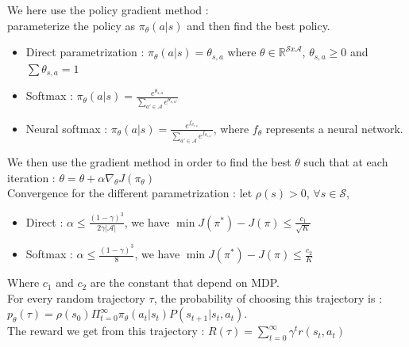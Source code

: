 \documentclass[../main.tex]{subfiles}
\begin{document}
We here use the policy gradient method : \\
parameterize the policy as $\pi_\theta(a\lvert s)$ and then find the best policy.\\

\begin{itemize}
    \item Direct parametrization : $\pi_\theta(a\lvert s) = \theta_{s,a}$ where $\theta \in \mathbb{R}^{\mathcal{S}x \mathcal{A}}$, $\theta_{s,a} \geq 0$ and $\sum \theta_{s,a} = 1$\\
    \item Softmax : $\pi_\theta (a\lvert s) = \frac{e^{\theta_{s,a}}}{\sum_{a'\in \mathcal{A}} e^{\theta_{s,a'}}}$\\
    \item Neural softmax : $\pi_\theta(a\lvert s) = \frac{e^{f_{\theta_{s,a}}}}{\sum_{a'\in \mathcal{A}} e^{f_{\theta_{s,a'}}}}$, where $f_\theta$ represents a neural network.\\
\end{itemize}

We then use the gradient method in order to find the best $\theta$ such that at each iteration : $\theta = \theta + \alpha \nabla_\theta J(\pi_\theta)$\\

Convergence for the different parametrization : let $\rho(s) >0$, $\forall s \in \mathcal{S}$,\\ \begin{itemize}
    \item Direct : $\alpha \leq \frac{(1-\gamma)^3}{2\gamma \lvert \mathcal{A}\rvert}$, we have $\min J(\pi^*)-J(\pi) \leq \frac{c_1}{\sqrt{K}}$\\
    \item Softmax : $\alpha \leq \frac{(1-\gamma)^3}{8}$, we have $\min J(\pi^*)-J(\pi) \leq \frac{c_2}{K}$\\
\end{itemize}
Where $c_1$ and $c_2$ are the constant that depend on MDP.\\

For every random trajectory $\tau$, the probability of choosing this trajectory is : $p_\theta(\tau) = \rho(s_0) \Pi_{t=0}^\infty \pi_\theta(a_t\lvert s_t) P(s_{t+1}\lvert s_t,a_t)$.\\

The reward we get from this trajectory : $R(\tau) = \sum_{t=0}^\infty \gamma^t r(s_t,a_t)$\\
\end{document}
